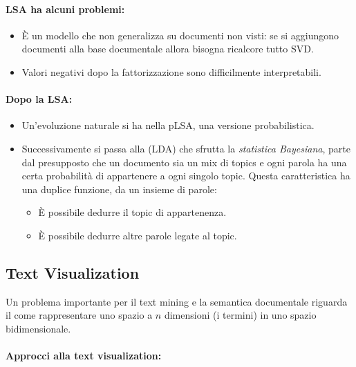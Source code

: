 \paragraph{LSA ha alcuni problemi:}

\begin{itemize}
  \item È un modello che non generalizza su documenti non visti: se si aggiungono documenti alla base documentale allora bisogna ricalcore tutto SVD. 
  \item Valori negativi dopo la fattorizzazione sono difficilmente interpretabili. 
\end{itemize}

\paragraph{Dopo la LSA:}

\begin{itemize}
  \item Un'evoluzione naturale si ha nella pLSA, una versione probabilistica. 
  \item Successivamente si passa alla  (LDA) che sfrutta la \textit{statistica Bayesiana}, parte dal presupposto che un documento sia un mix di topics e ogni parola ha una certa probabilità di appartenere a ogni singolo topic. Questa caratteristica ha una duplice funzione, da un insieme di parole:
    \begin{itemize}
      \item È possibile dedurre il topic di appartenenza. 
      \item È possibile dedurre altre parole legate al topic.
    \end{itemize}
\end{itemize}

\subsection{Text Visualization}

Un problema importante per il text mining e la semantica documentale riguarda il come rappresentare uno spazio a $n$ dimensioni (i termini) in uno spazio bidimensionale. 


\paragraph{Approcci alla text visualization:}

